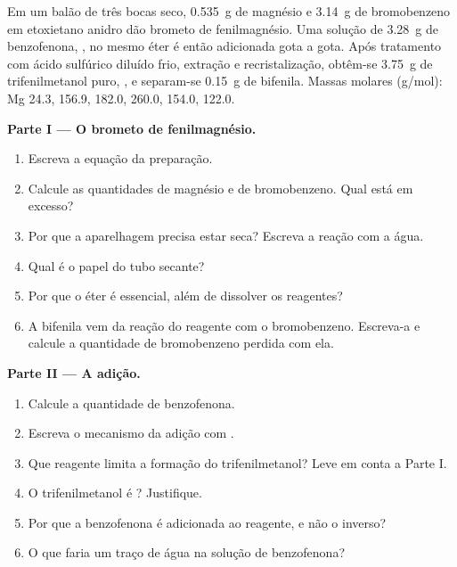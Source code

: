 \begin{problem}
\label{pb:b1:organomagnesium:1}
Em um balão de três bocas seco, \qty{0.535}{g} de magnésio e
\qty{3.14}{g} de bromobenzeno em etoxietano anidro dão brometo de
fenilmagnésio. Uma solução de \qty{3.28}{g} de benzofenona,
, no mesmo éter é então adicionada gota a gota. Após
tratamento com ácido sulfúrico diluído frio, extração e
recristalização, obtêm-se \qty{3.75}{g} de trifenilmetanol puro,
, e separam-se \qty{0.15}{g} de bifenila. Massas molares
(\unit{g/mol}):
Mg 24.3,  156.9,  182.0,  260.0,
 154.0,  122.0.

\medskip
\noindent\textbf{Parte I --- O brometo de fenilmagnésio.}
\begin{enumerate}
  \item Escreva a equação da preparação.
  \item Calcule as quantidades de magnésio e de bromobenzeno. Qual está
        em excesso?
  \item Por que a aparelhagem precisa estar seca? Escreva a reação com a
        água.
  \item Qual é o papel do tubo secante?
  \item Por que o éter é essencial, além de dissolver os reagentes?
  \item A bifenila vem da reação do reagente com o bromobenzeno.
        Escreva-a e calcule a quantidade de bromobenzeno perdida com ela.
\end{enumerate}

\medskip
\noindent\textbf{Parte II --- A adição.}
\begin{enumerate}[resume]
  \item Calcule a quantidade de benzofenona.
  \item Escreva o mecanismo da adição com .
  \item Que reagente limita a formação do trifenilmetanol? Leve em conta
        a Parte I.
  \item O trifenilmetanol é ? Justifique.
  \item Por que a benzofenona é adicionada ao reagente, e não o inverso?
  \item O que faria um traço de água na solução de benzofenona?
\end{enumerate}


\end{problem}
